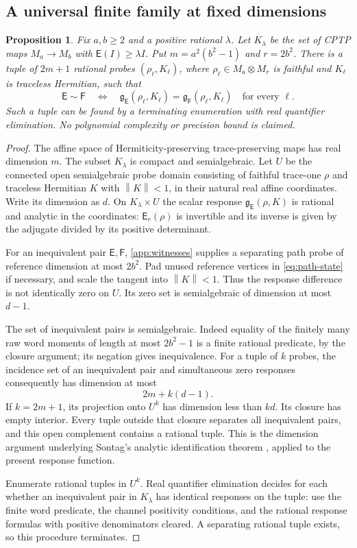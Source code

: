 \documentclass[11pt,reqno]{amsart}
\newtheorem{proposition}[theorem]{Proposition}
\theoremstyle{definition}
\theoremstyle{remark}
\numberwithin{equation}{section}
\newcommand{\E}{\mathsf E}
\newcommand{\F}{\mathsf F}
\newcommand{\norm}[1]{\left\lVert#1\right\rVert}
\newcommand{\rld}{\mathfrak g}
\begin{document}
\subsection{A universal finite family at fixed dimensions}

\begin{proposition}\label{prop:finite-probes}
Fix $a,b\ge2$ and a positive rational $\lambda$. Let $K_\lambda$ be the set of CPTP maps $M_a\to M_b$ with $\E(I)\ge\lambda I$. Put $m=a^2(b^2-1)$ and $r=2b^2$. There is a tuple of $2m+1$ rational probes $(\rho_\ell,K_\ell)$, where $\rho_\ell\in M_a\otimes M_r$ is faithful and $K_\ell$ is traceless Hermitian, such that
\[
 \E\sim\F\quad\Longleftrightarrow\quad
 \rld_\E(\rho_\ell,K_\ell)=\rld_\F(\rho_\ell,K_\ell)
 \quad\text{for every }\ell.
\]
Such a tuple can be found by a terminating enumeration with real quantifier elimination. No polynomial complexity or precision bound is claimed.
\end{proposition}

\begin{proof}
The affine space of Hermiticity-preserving trace-preserving maps has real dimension $m$. The subset $K_\lambda$ is compact and semialgebraic. Let $U$ be the connected open semialgebraic probe domain consisting of faithful trace-one $\rho$ and traceless Hermitian $K$ with $\norm K<1$, in their natural real affine coordinates. Write its dimension as $d$. On $K_\lambda\times U$ the scalar response $\rld_\E(\rho,K)$ is rational and analytic in the coordinates: $\E_r(\rho)$ is invertible and its inverse is given by the adjugate divided by its positive determinant.

For an inequivalent pair $\E,\F$, \cref{app:witnesses} supplies a separating path probe of reference dimension at most $2b^2$. Pad unused reference vertices in \eqref{eq:path-state} if necessary, and scale the tangent into $\norm K<1$. Thus the response difference is not identically zero on $U$. Its zero set is semialgebraic of dimension at most $d-1$.

The set of inequivalent pairs is semialgebraic. Indeed equality of the finitely many raw word moments of length at most $2b^2-1$ is a finite rational predicate, by the closure argument; its negation gives inequivalence. For a tuple of $k$ probes, the incidence set of an inequivalent pair and simultaneous zero responses consequently has dimension at most
\[
 2m+k(d-1).
\]
If $k=2m+1$, its projection onto $U^k$ has dimension less than $kd$. Its closure has empty interior. Every tuple outside that closure separates all inequivalent pairs, and this open complement contains a rational tuple. This is the dimension argument underlying Sontag's analytic identification theorem \cite[Theorem~2]{Sontag}, applied to the present response function.

Enumerate rational tuples in $U^k$. Real quantifier elimination decides for each whether an inequivalent pair in $K_\lambda$ has identical responses on the tuple: use the finite word predicate, the channel positivity conditions, and the rational response formulas with positive denominators cleared. A separating rational tuple exists, so this procedure terminates.
\end{proof}
\end{document}
